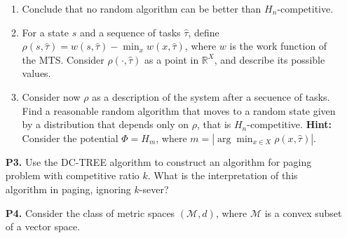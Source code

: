 \documentclass[11pt, spanish]{article}
\theoremstyle{plain}
\newcommand{\R}{\mathds{R}}
\begin{document}
\begin{itemize}
\begin{enumerate}
      \item Conclude that no random algorithm can be better than $H_n$-competitive.
      \item For a state $s$ and a sequence of tasks $\hat{\tau}$, define
	$\rho(s,\hat{\tau})= w(s,\hat{\tau}) - \min_x w(x,\hat{\tau})$, where
	$w$ is the work function of the MTS. Consider $\rho(\cdot,\hat{\tau})$ as
	a point in $\R^X$, and describe its possible values.
      \item Consider now $\rho$ as a description of the system after a secuence
	of tasks. Find a reasonable random algorithm that moves to a random
	state given by a distribution that depends only on $\rho$, that is
	$H_n$-competitive. \textbf{Hint:} Consider the potential $\Phi=H_m$, where
	$m= | \arg\min_{x\in X} \rho(x,\hat{\tau}) |$.
    \end{enumerate}

  \item[\textbf{P3.}] Use the DC-TREE algorithm to construct an algorithm for paging problem with competitive ratio $k$. What is the interpretation of this algorithm in paging, ignoring $k$-sever?

  \item[\textbf{P4.}] Consider the class of metric spaces $(\mathcal{M},d)$, where $\mathcal{M}$
  is a convex subset of a vector space. 

\end{itemize}
\end{document}
